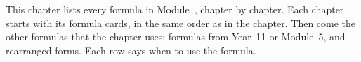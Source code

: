 \label{fs:chap}

\newcommand\fsYes{\textcolor{hscformula}{\footnotesize\bfseries\faCheck\ Yes}}
\newcommand\fsNo{\textcolor{hscmistake}{\footnotesize\bfseries\faTimes\ Learn it}}
\newcommand\fsComb{\textcolor{hsctiptext}{\footnotesize\bfseries\faLink\ Combine}}
\newcommand\fspad[1]{\raisebox{0pt}[\dimexpr\height+1.0ex\relax][\dimexpr\depth+0.8ex\relax]{#1}}
\newcommand\fsrow[3]{\rule[-1.9ex]{0pt}{5.0ex}\fspad{#2} & #3 & #1\\\hline}
\newcommand\fsch[2]{\multicolumn{3}{@{}l@{}}{\rule[-1.2ex]{0pt}{5.2ex}\normalsize
  \cref{#1}: {\bfseries\color{hscbrand}#2}}\\*\hline\noalign{\nobreak}}
\newcommand\fsalso[1]{\multicolumn{3}{@{}l@{}}{\rule[-1.0ex]{0pt}{4.0ex}\footnotesize
  \itshape\textcolor{hscmuted}{Also used in \cref{#1}: formulas from Year 11 or Module 5,
  and rearranged forms}}\\*\hline\noalign{\nobreak}}
\newcommand\fshead{\colhead{Formula} & \colhead{When to use it} & \colhead{On the sheet?}}

This chapter lists every formula in Module~\modulenumber, chapter by chapter. Each
chapter starts with its formula cards, in the same order as in the chapter. Then come the
other formulas that the chapter uses: formulas from Year~11 or Module~5, and rearranged
forms. Each row says when to use the formula.

